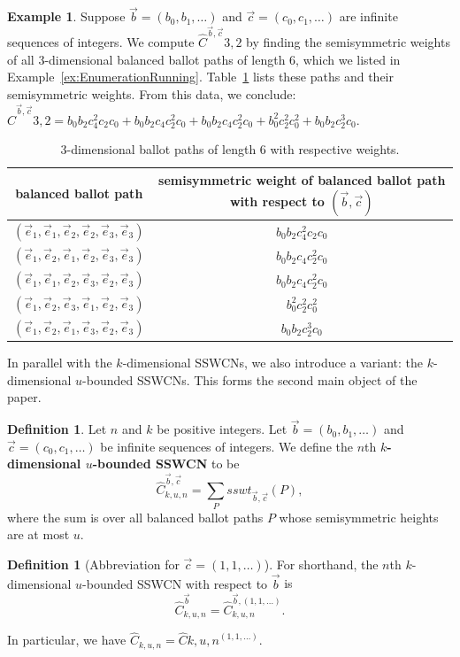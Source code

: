 \documentclass[11pt]{article}
\theoremstyle{remark}
\theoremstyle{definition}
\newtheorem{definition}[theorem]{Definition}
\newtheorem{example}[theorem]{Example}
\begin{document}
\begin{example}\label{ex:computation}
Suppose $\vec{b} = (b_0, b_1, \dots)$ and $\vec{c} = (c_0, c_1, \dots)$ are infinite sequences of integers. We compute $\widehat{C}^{\vec{b}, \vec{c}}{3, 2}$ by finding the semisymmetric weights of all 3-dimensional balanced ballot paths of length $6$, which we listed in Example~\ref{ex:EnumerationRunning}. Table~\ref{tab:ballotPathTablewWeights} lists these paths and their semisymmetric weights. From this data, we conclude:
$\widehat{C}^{\vec{b}, \vec{c}}{3, 2} =  b_0b_2c_4^2c_2c_0 + b_0b_2c_4c_2^2c_0 + b_0b_2c_4c_2^2c_0 + b_0^2c_2^2c_0^2 + b_0b_2c_2^3c_0.$

\begin{table}[H]
\centering
\begin{tabular}{|c|c|}
\hline  balanced ballot path & semisymmetric weight of balanced ballot path with respect to $(\vec{b}, \vec{c})$ \\ \hline
$(\vec{e}_1, \vec{e}_1, \vec{e}_2, \vec{e}_2, \vec{e}_3, \vec{e}_3)$ & $b_0b_2c_4^2c_2c_0$        \\ \hline $(\vec{e}_1, \vec{e}_2, \vec{e}_1, \vec{e}_2, \vec{e}_3, \vec{e}_3)$ & $b_0b_2c_4c_2^2c_0$ \\ \hline $(\vec{e}_1, \vec{e}_1, \vec{e}_2, \vec{e}_3, \vec{e}_2, \vec{e}_3)$ & $b_0b_2c_4c_2^2c_0$ \\ \hline $(\vec{e}_1, \vec{e}_2, \vec{e}_3, \vec{e}_1, \vec{e}_2, \vec{e}_3)$ & $b_0^2c_2^2c_0^2$ \\ \hline $(\vec{e}_1, \vec{e}_2, \vec{e}_1, \vec{e}_3, \vec{e}_2, \vec{e}_3)$ & $b_0b_2c_2^3c_0$ \\ \hline
\end{tabular}
\caption{3-dimensional ballot paths of length $6$ with respective weights.}
\label{tab:ballotPathTablewWeights}
\end{table}
\end{example}

In parallel with the $k$-dimensional SSWCNs, we also introduce a variant: the $k$-dimensional $u$-bounded SSWCNs. This forms the second main object of the paper.

\begin{definition}
\label{defn:k-dims-boundCat}
Let $n$ and $k$ be positive integers.  Let $\vec{b} = (b_0,b_1, \dots)$ and $\vec{c}=(c_0, c_1, \dots)$ be infinite sequences of integers. We define the $n$th \textbf{$k$-dimensional $u$-bounded SSWCN} to be $$\widehat{C}_{k, u, n}^{\vec{b}, \vec{c}} = \sum_{P}sswt_{\vec{b}, \vec{c}}(P),$$ where the sum is over all balanced ballot paths $P$ whose semisymmetric heights are at most $u$.
\end{definition}
\begin{definition}[Abbreviation for $\vec{c} = (1, 1, \dots)$]\label{def:abbrv2}For shorthand, the $n$th {$k$-dimensional $u$-bounded SSWCN with respect to $\vec{b}$} is $$\widehat{C}_{k, u, n}^{\vec{b}} = \widehat{C}_{k, u, n}^{\vec{b}, (1, 1, \dots)}.$$
\end{definition}
In particular, we have $\widehat{C}_{k, u, n} = \widehat{C}{k, u, n}^{(1, 1, \dots )}$.
\end{document}

